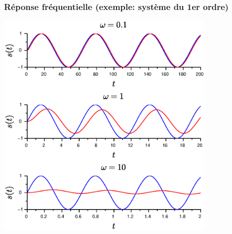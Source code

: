 \documentclass[[14pt]{beamer}
\begin{document}
\begin{frame}
    \frametitle{Réponse fréquentielle (exemple: système du 1er ordre)}
\begin{center}
\includegraphics[width=0.8\textwidth]{fig/fig_1er_4.eps}
\end{center}
\end{frame}
\end{document}
